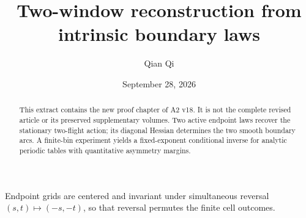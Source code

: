 \documentclass[11pt]{amsart}
\title[A2 v18: new proof extract]{Two-window reconstruction from intrinsic boundary laws}
\author{Qian Qi}
\date{September 28, 2026}
\theoremstyle{definition}\newtheorem{definition}[theorem]{Definition}
\theoremstyle{remark}\newtheorem{remark}[theorem]{Remark}
\numberwithin{equation}{section}
\begin{document}
\begin{abstract}
This extract contains the new proof chapter of A2 v18. It is not the
complete revised article or its preserved supplementary volumes.
Two active endpoint laws recover the stationary two-flight action;
its diagonal Hessian determines the two smooth boundary arcs.
A finite-bin experiment yields a fixed-exponent conditional inverse
for analytic periodic tables with quantitative asymmetry margins.
\end{abstract}
\maketitle
Endpoint grids are centered and invariant under simultaneous reversal
$(s,t)\mapsto(-s,-t)$, so that reversal permutes the finite cell outcomes.

\end{document}

